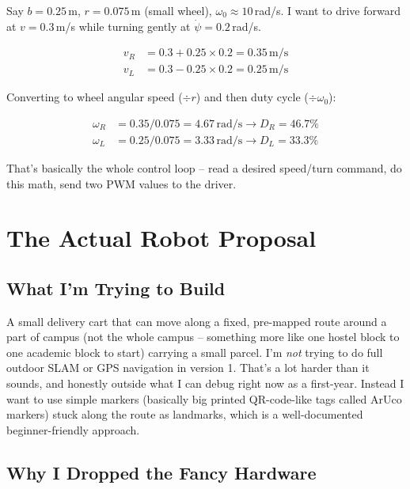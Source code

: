 \documentclass[12pt,a4paper]{article}
\begin{document}
Say $b = 0.25$\,m, $r = 0.075$\,m (small wheel), $\omega_0 \approx 10$\,rad/s. I want to
drive forward at $v = 0.3$\,m/s while turning gently at $\dot{\psi} = 0.2$\,rad/s.

\begin{align*}
    v_R &= 0.3 + 0.25 \times 0.2 = 0.35\,\text{m/s} \\
    v_L &= 0.3 - 0.25 \times 0.2 = 0.25\,\text{m/s}
\end{align*}

Converting to wheel angular speed ($\div r$) and then duty cycle ($\div \omega_0$):

\begin{align*}
    \omega_R &= 0.35/0.075 = 4.67\,\text{rad/s} \rightarrow D_R = 46.7\% \\
    \omega_L &= 0.25/0.075 = 3.33\,\text{rad/s} \rightarrow D_L = 33.3\%
\end{align*}

That's basically the whole control loop -- read a desired speed/turn command, do this
math, send two PWM values to the driver.

\section{The Actual Robot Proposal}

\subsection{What I'm Trying to Build}

A small delivery cart that can move along a fixed, pre-mapped route around a part of
campus (not the whole campus -- something more like one hostel block to one
academic block to start) carrying a small parcel. I'm \emph{not} trying to do full
outdoor SLAM or GPS navigation in version 1. That's a lot harder than it sounds, and
honestly outside what I can debug right now as a first-year. Instead I want to use simple
markers (basically big printed QR-code-like tags called ArUco markers) stuck along the
route as landmarks, which is a well-documented beginner-friendly approach.

\subsection{Why I Dropped the Fancy Hardware}
\end{document}
